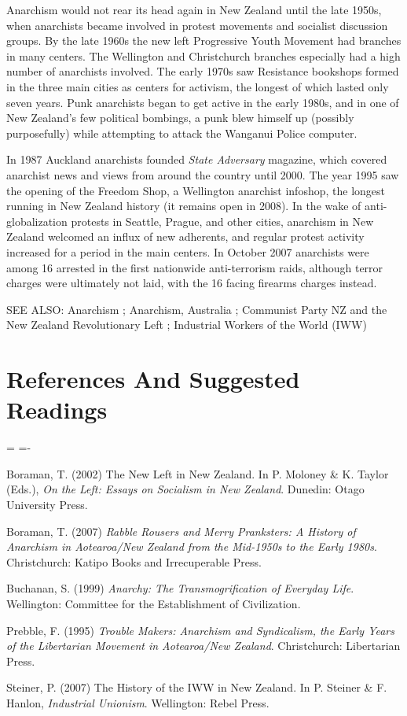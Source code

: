 \documentclass[DIV=12,%
               BCOR=10mm,%
               headinclude=false,%
               footinclude=false,open=any,%
               fontsize=11pt,%
               twoside,%
               paper=210mm:11in]%
               {scrbook}
\newenvironment*{amusebiblio}{
  \leftskip=\parindent
  \parindent=-\parindent
  \smallskip
  \indent
}{\smallskip}
\newcommand*{\Slash}{\slash\hspace{0pt}}
\begin{document}
Anarchism would not rear its head again in New Zealand until the late 1950s, when anarchists became involved in protest movements and socialist discussion groups. By the late 1960s the new left Progressive Youth Movement had branches in many centers. The Wellington and Christchurch branches especially had a high number of anarchists involved. The early 1970s saw Resistance bookshops formed in the three main cities as centers for activism, the longest of which lasted only seven years. Punk anarchists began to get active in the early 1980s, and in one of New Zealand’s few political bombings, a punk blew himself up (possibly purposefully) while attempting to attack the Wanganui Police computer.


In 1987 Auckland anarchists founded \emph{State Adversary} magazine, which covered anarchist news and views from around the country until 2000. The year 1995 saw the opening of the Freedom Shop, a Wellington anarchist infoshop, the longest running in New Zealand history (it remains open in 2008). In the wake of anti-globalization protests in Seattle, Prague, and other cities, anarchism in New Zealand welcomed an influx of new adherents, and regular protest activity increased for a period in the main centers. In October 2007 anarchists were among 16 arrested in the first nationwide anti-terrorism raids, although terror charges were ultimately not laid, with the 16 facing firearms charges instead.


SEE ALSO: Anarchism ; Anarchism, Australia ; Communist Party NZ and the New Zealand Revolutionary Left ; Industrial Workers of the World (IWW)

\section{References And Suggested Readings}



\begin{amusebiblio}


Boraman, T. (2002) The New Left in New Zealand. In P. Moloney \& K. Taylor (Eds.), \emph{On the Left: Essays on Socialism in New Zealand}. Dunedin: Otago University Press.


Boraman, T. (2007) \emph{Rabble Rousers and Merry Pranksters: A History of Anarchism in Aotearoa\Slash{}New Zealand from the Mid-1950s to the Early 1980s}. Christchurch: Katipo Books and Irrecuperable Press.


Buchanan, S. (1999) \emph{Anarchy: The Transmogrification of Everyday Life}. Wellington: Committee for the Establishment of Civilization.


Prebble, F. (1995) \emph{Trouble Makers: Anarchism and Syndicalism, the Early Years of the Libertarian Movement in Aotearoa\Slash{}New Zealand}. Christchurch: Libertarian Press.


Steiner, P. (2007) The History of the IWW in New Zealand. In P. Steiner \& F. Hanlon, \emph{Industrial Unionism}. Wellington: Rebel Press.



\end{amusebiblio}
\end{document}
